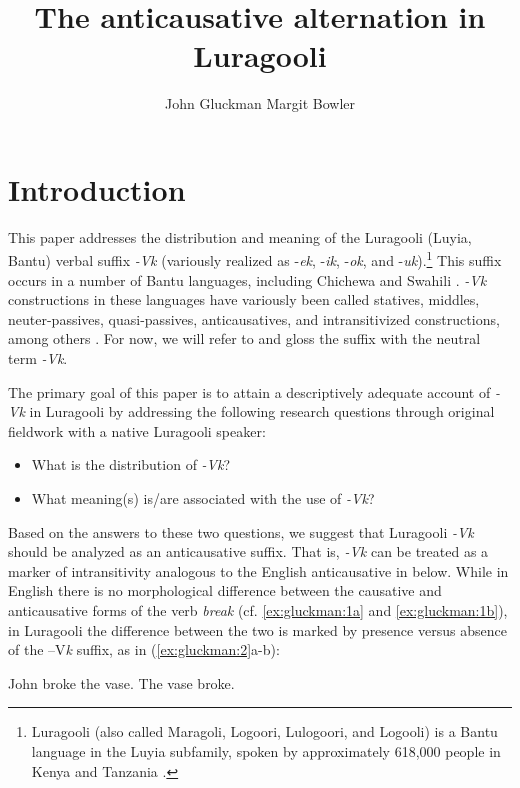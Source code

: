 \documentclass[output=paper]{langsci/lanmgscibook}
\title{The anticausative alternation in Luragooli}
\author{%
 John Gluckman\affiliation{UCLA}\lastand 
 Margit Bowler \affiliation{UCLA}
}
\begin{document}
\section{Introduction}\label{sec:gluckman:1}

This paper addresses the distribution and meaning of the Luragooli (Luyia, Bantu) verbal suffix \textit{-Vk} (variously realized as -\textit{ek}, -\textit{ik}, -\textit{ok}, and -\textit{uk}).\footnote{Luragooli (also called Maragoli, Logoori, Lulogoori, and Logooli) is a Bantu language in the Luyia subfamily, spoken by approximately 618,000 people in Kenya and Tanzania \citep{LewisEtAl2015}.} This suffix occurs in a number of Bantu languages, including Chichewa \citep{Mchombo1993,Simango2009} and Swahili \citep{SeidlDimitriadis2003}. \textit{-Vk} constructions in these languages have variously been called statives, middles, neuter-passives, quasi-passives, anticausatives, and intransitivized constructions, among others \citep{Mchombo1993,Dubinsky1996,SeidlDimitriadis2003,Fernando2013}. For now, we will refer to and gloss the suffix with the neutral term \textit{-Vk}.

The primary goal of this paper is to attain a descriptively adequate account of \textit{-Vk} in Luragooli by addressing the following research questions through original fieldwork with a native Luragooli speaker:

\begin{itemize}
\item What is the distribution of \textit{-Vk}?
\item What meaning(s) is/are associated with the use of \textit{-Vk}?
\end{itemize}

Based on the answers to these two questions, we suggest that Luragooli \textit{-Vk} should be analyzed as an anticausative suffix. That is, \textit{-Vk} can be treated as a marker of intransitivity analogous to the English anticausative in  below. While in English there is no morphological difference between the causative and anticausative forms of the verb \textit{break} (cf. \ref{ex:gluckman:1a} and \ref{ex:gluckman:1b}), in Luragooli the difference between the two is marked by presence versus absence of the –V\textit{k} suffix, as in (\ref{ex:gluckman:2}a-b):


\ea\label{ex:gluckman:1} 
\ea\label{ex:gluckman:1a} 
\settowidth{}
   John broke the vase.   
 \ex \label{ex:gluckman:1b} 
\settowidth{}
 The vase broke.        
 \z
\z
\end{document}
